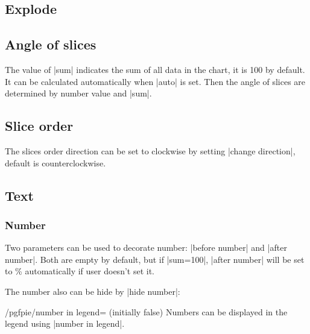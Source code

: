 \documentclass{ltxdoc}
\begin{document}
\codeexample[scale=0.4,from file={demo/color.tex}]

\subsection{Explode}
\codeexample[scale=0.4,from file={demo/explode.tex}]

\subsection{Angle of slices}
The value of |sum| indicates the sum of all data in the chart,
it is 100 by default. It can be calculated automatically when
|auto| is set. Then the angle of slices are determined by
number value and |sum|.

\codeexample[scale=0.4,from file={demo/sum.tex}]

\subsection{Slice order}
The slices order direction can be set to clockwise by setting |change direction|, default is counterclockwise.

\codeexample[scale=0.4,from file={demo/change-direction.tex}]

\subsection{Text}

\subsubsection{Number}
Two parameters can be used to decorate number: |before number|
and |after number|. Both are empty by default, but if
|sum=100|, |after number| will be set to \%
automatically if user doesn't set it.

\codeexample[scale=0.25,from file={demo/before-after-number.tex}]

The number also can be hide by |hide number|:

\codeexample[scale=0.25,from file={demo/hide-number.tex}]

\begin{key}{/pgfpie/number in legend= (initially false)}
  Numbers can be displayed in the legend using |number in legend|.
\codeexample[scale=0.4,from file={demo/numberinlegend.tex}]
\end{key}
\end{document}
